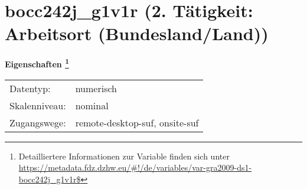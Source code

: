 
    \setcounter{footnote}{0}

    \vspace*{-1.8cm}
	\section{bocc242j\_g1v1r (2. Tätigkeit: Arbeitsort (Bundesland/Land))}
	\label{section:bocc242j_g1v1r}



    \vspace*{0.5cm}
    \noindent\textbf{Eigenschaften
	\footnote{Detailliertere Informationen zur Variable finden sich unter
		\url{https://metadata.fdz.dzhw.eu/\#!/de/variables/var-gra2009-ds1-bocc242j_g1v1r$}}}\\
	\begin{tabularx}{\hsize}{@{}lX}
	Datentyp: & numerisch \\
	Skalenniveau: & nominal \\
	Zugangswege: &
	  remote-desktop-suf, 
	  onsite-suf
 \\
    \end{tabularx}



